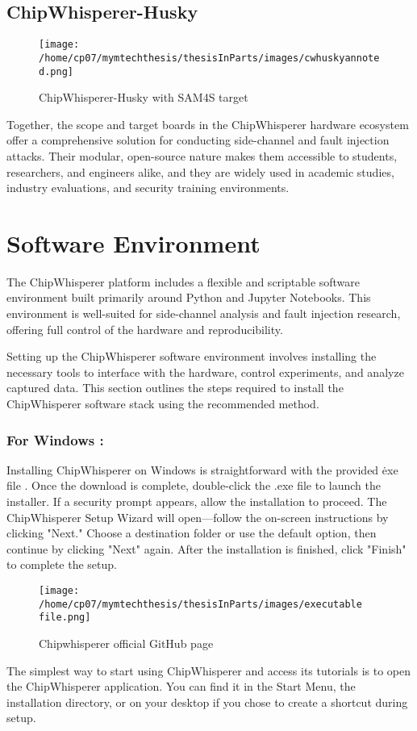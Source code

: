\subsection{ChipWhisperer-Husky}
\begin{figure}[h]
    \centering
    \texttt{[image: /home/cp07/mymtechthesis/thesisInParts/images/cwhuskyannoted.png]}
    \caption{ChipWhisperer-Husky with SAM4S target}
    \label{fig:husky_target}
\end{figure}
Together, the scope and target boards in the ChipWhisperer hardware ecosystem offer a comprehensive solution for conducting side-channel and fault injection attacks. Their modular, open-source nature makes them accessible to students, researchers, and engineers alike, and they are widely used in academic studies, industry evaluations, and security training environments.

\section{Software Environment}
The ChipWhisperer platform includes a flexible and scriptable software environment built primarily around Python and Jupyter Notebooks. This environment is well-suited for side-channel analysis and fault injection research, offering full control of the hardware and reproducibility. 

 Setting up the ChipWhisperer software environment involves installing the necessary tools to interface with the hardware, control experiments, and analyze captured data. This section outlines the steps required to install the ChipWhisperer software stack using the recommended method.
\subsubsection{For Windows :}
Installing ChipWhisperer on Windows is straightforward with the provided \.exe file \cite{chipwhisperer2025}. Once the download is complete, double-click the .exe file to launch the installer. If a security prompt appears, allow the installation to proceed. The ChipWhisperer Setup Wizard will open—follow the on-screen instructions by clicking "Next." Choose a destination folder or use the default option, then continue by clicking "Next" again. After the installation is finished, click "Finish" to complete the setup.
\begin{figure}[h]
    \centering
    \texttt{[image: /home/cp07/mymtechthesis/thesisInParts/images/executable file.png]}
    \caption{Chipwhisperer official GitHub page}
    \label{fig:windows_installation}
\end{figure}
The simplest way to start using ChipWhisperer and access its tutorials is to open the ChipWhisperer application. You can find it in the Start Menu, the installation directory, or on your desktop if you chose to create a shortcut during setup.


